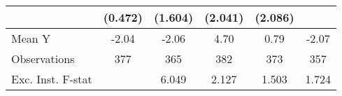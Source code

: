 {\begin{tabular}{l*{5}{c}}
            &     (0.472)         &     (1.604)         &     (2.041)         &     (2.086)         &                     \\
\midrule
Mean Y      &       -2.04         &       -2.06         &        4.70         &        0.79         &       -2.07         \\
Observations&         377         &         365         &         382         &         373         &         357         \\
Exc. Inst. F-stat&                     &       6.049         &       2.127         &       1.503         &       1.724         \\
\bottomrule
\end{tabular}
}

